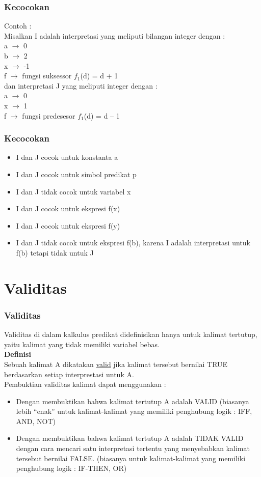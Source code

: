 \documentclass[handout]{beamer}
\theoremstyle{definition}
\theoremstyle{example}
\begin{document}
\begin{frame}
	\frametitle{Kecocokan}
	Contoh :\\
	Misalkan I adalah interpretasi yang meliputi bilangan integer dengan :\\
	a $\rightarrow$ 0\\ 
	b $\rightarrow$ 2\\
	x $\rightarrow$ -1\\ 
	f $\rightarrow$ fungsi suksessor $f_1$(d) = d + 1\\
	dan interpretasi J yang meliputi integer dengan :\\
	a $\rightarrow$ 0\\
	x $\rightarrow$ 1\\
	f $\rightarrow$	fungsi predesesor $f_1$(d) = d – 1   
	
\end{frame}

\begin{frame}
	\frametitle{Kecocokan}
	 \begin{itemize}
		\item I dan J cocok untuk konstanta a
		\item I dan J cocok untuk simbol predikat p
		\item I dan J tidak cocok untuk variabel x
		\item I dan J cocok untuk ekspresi f(x)
		\item I dan J cocok untuk ekspresi f(y)
		\item I dan J tidak cocok untuk ekspresi f(b), karena I adalah interpretasi untuk f(b) tetapi tidak untuk J 
	\end{itemize}
\end{frame}	

\section{Validitas}
\begin{frame}
	\frametitle{Validitas}
	Validitas di dalam kalkulus predikat didefinisikan hanya untuk kalimat tertutup, yaitu kalimat yang tidak memiliki variabel bebas.\\
	\vspace{2mm}
	\textbf{Definisi}\\
	Sebuah kalimat A dikatakan \underline{valid} jika kalimat tersebut bernilai TRUE berdasarkan setiap interprestasi untuk A.\\
	\vspace{2mm}
	Pembuktian validitas kalimat dapat menggunakan :\\
	\begin{itemize}
		\item Dengan membuktikan bahwa kalimat tertutup A adalah VALID	(biasanya lebih “enak” untuk kalimat-kalimat yang memiliki penghubung logik : 
		IFF, AND, NOT)
		\item Dengan membuktikan bahwa kalimat tertutup A adalah TIDAK VALID dengan	cara mencari satu interpretasi tertentu yang menyebabkan kalimat tersebut bernilai FALSE. 
		(biasanya untuk kalimat-kalimat yang memiliki penghubung logik : IF-THEN, OR)
	\end{itemize}
	
\end{frame}	
\end{document}
